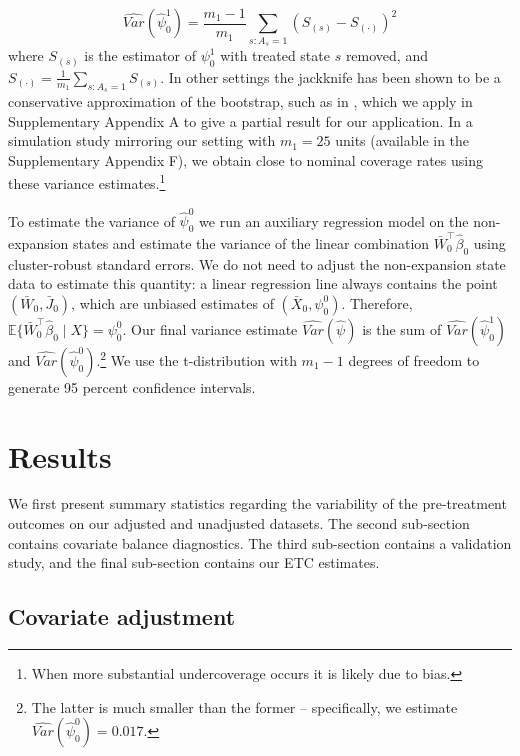 \documentclass[aoas]{imsart}
\theoremstyle{plain}
\theoremstyle{remark}
\begin{document}
\begin{equation}\label{eqn:jackknife}
 \hat{Var}(\hat{\psi}_0^1) = \frac{m_1 - 1}{m_1} \sum_{s:A_s = 1} \left( S_{(s)} - S_{(\cdot)} \right)^2
\end{equation}
%
where $S_{(s)}$ is the estimator of $\psi_0^1$ with treated state $s$ removed, and $S_{(\cdot)} = \frac{1}{m_1} \sum_{s:A_s=1} S_{(s)}$. In other settings the jackknife has been shown to be a conservative approximation of the bootstrap, such as in \citet{efron1981jackknife}, which we apply in Supplementary Appendix A to give a partial result for our application. In a simulation study mirroring our setting with $m_1 = 25$ units (available in the Supplementary Appendix F), we obtain close to nominal coverage rates using these variance estimates.\footnote{When more substantial undercoverage occurs it is likely due to bias.}

To estimate the variance of $\hat{\psi}_0^0$ we run an auxiliary regression model on the non-expansion states and estimate the variance of the linear combination $\bar{W}_0^\top\hat{\beta}_0$ using cluster-robust standard errors. We do not need to adjust the non-expansion state data to estimate this quantity: a linear regression line always contains the point $(\bar{W}_0, \bar{J}_0)$, which are unbiased estimates of $(\bar{X}_0, \psi_0^0)$. Therefore, $\mathbb{E}\{\bar{W}_0^\top\hat{\beta}_0 \mid X\} = \psi_0^0$. Our final variance estimate $\hat{Var}(\hat{\psi})$ is the sum of $\hat{Var}(\hat{\psi}_0^1)$ and $\hat{Var}(\hat{\psi}_0^0)$.\footnote{The latter is much smaller than the former -- specifically, we estimate $\hat{Var}(\hat{\psi}_0^0) = 0.017$.} We use the t-distribution with $m_1 - 1$ degrees of freedom to generate 95 percent confidence intervals.

\section{Results}\label{sec:results}

We first present summary statistics regarding the variability of the pre-treatment outcomes on our adjusted and unadjusted datasets. The second sub-section contains covariate balance diagnostics. The third sub-section contains a validation study, and the final sub-section contains our ETC estimates.

\subsection{Covariate adjustment}
\end{document}
